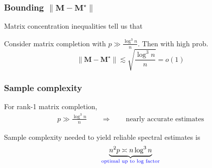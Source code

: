 \documentclass[compress,
mathserif,wide,%
]{beamer}
\begin{document}
\begin{frame}
	\frametitle{Bounding $\|\bm{M} - \bm{M}^\star\|$}
Matrix concentration inequalities tell us that 
%
\begin{lemma}
\label{lem:perturbation-SBM}
%
Consider matrix completion with $p \gg \frac{\log^{3} n}{n}$. Then with high prob. 
%
\begin{equation}
	\label{eq:MC-perturbation}
	\|\bm{M}-\bm{M}^{\star}\|\lesssim {\sqrt{\frac{\log^{3} n }{n}}} = o(1)
\end{equation}
%
\end{lemma}

	
\end{frame}



\begin{frame}
\frametitle{Sample complexity}

For rank-1 matrix completion, 
%
\begin{align*}
	p\gg \frac{\log^{3}n}{n}  \qquad \Longrightarrow \qquad \text{nearly accurate estimates}
\end{align*}


\vfill

Sample complexity needed to yield reliable spectral estimates is 
%
\[
	\underset{\textcolor{blue}{ \text{optimal up to log factor}}}{\underbrace{ n^2 p \asymp n \log ^3 n  }} 
\]
%

\end{frame}
\end{document}
